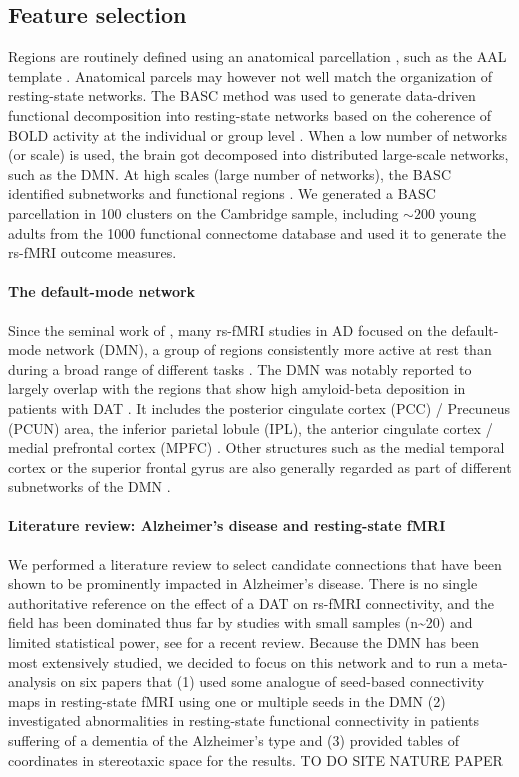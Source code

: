 \documentclass[authoryear]{elsarticle}
\begin{document}
\subsection{Feature selection}
Regions are routinely defined using an anatomical parcellation \citep{He2009}, such as the AAL template \citep{Tzourio-Mazoyer2002}. Anatomical parcels may however not well match the organization of resting-state networks. The BASC method was used to generate data-driven functional decomposition into resting-state networks based on the coherence of BOLD activity at the individual or group level \citep{Bellec2006,Bellec2010c,Bellec2013}. When a low number of networks (or scale) is used, the brain got decomposed into distributed large-scale networks, such as the DMN. At high scales (large number of networks), the BASC identified subnetworks and functional regions \citep{Kelly2012}. We generated a BASC parcellation in 100 clusters on the Cambridge sample, including $\sim 200$ young adults from the 1000 functional connectome database \citep{Biswal2010} and used it to generate the rs-fMRI outcome measures.

\paragraph{The default-mode network}
Since the seminal work of \cite{Greicius2004}, many rs-fMRI studies in AD focused on the default-mode network (DMN), a group of regions consistently more active at rest than during a broad range of different tasks \citep{Gusnard2001}. The DMN was notably reported to largely overlap with the regions that show high amyloid-beta deposition in patients with DAT \citep{Buckner2009}. It includes the posterior cingulate cortex (PCC) / Precuneus (PCUN) area, the inferior parietal lobule (IPL), the anterior cingulate cortex / medial prefrontal cortex (MPFC) \citep{Greicius2003}. Other structures such as the medial temporal cortex or the superior frontal gyrus are also generally regarded as part of different subnetworks of the DMN \citep{Margulies2009, Andrews-Hanna2010a}.

\paragraph{Literature review: Alzheimer's disease and resting-state fMRI}
We performed a literature review to select candidate connections that have been shown to be prominently impacted in Alzheimer's disease. There is no single authoritative reference on the effect of a DAT on rs-fMRI connectivity, and the field has been dominated thus far by studies with small samples (n\textasciitilde20) and limited statistical power, see \cite{Sheline2013} for a recent review. Because the DMN has been most extensively studied, we decided to focus on this network and to run a meta-analysis on six papers that (1) used some analogue of seed-based connectivity maps in resting-state fMRI using one or multiple seeds in the DMN (2) investigated abnormalities in resting-state functional connectivity in patients suffering of a dementia of the Alzheimer's type and (3) provided tables of coordinates in stereotaxic space for the results.
TO DO SITE NATURE PAPER
\end{document}

